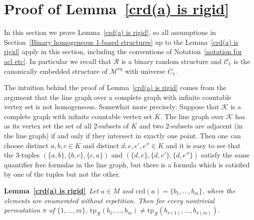 \documentclass[11pt, twoside]{amsart}
\numberwithin{equation}{section}
\newcommand{\tp}{\mathrm{tp}}
\newcommand{\crd}{\mathrm{crd}}
\newcommand{\meq}{^{\mathrm{eq}}}
\newcommand{\mcC}{\mathcal{C}}
\newcommand{\mcK}{\mathcal{K}}
\newcommand{\mcM}{\mathcal{M}}
\newcommand{\mcR}{\mathcal{R}}
\begin{document}
\section{Proof of Lemma~\ref{crd(a) is rigid}}\label{Proof of the main technical result}


\noindent
In this section we prove Lemma~\ref{crd(a) is rigid}, so all assumptions in Section~\ref{Binary homogeneous 1-based structures}
up to the Lemma~\ref{crd(a) is rigid} apply in this section, including the conventions of Notation~\ref{notation for acl etc}.
In particular we recall that $\mcR$ is a binary random structure and $\mcC_1$ is the canonically embedded structure of $\mcM\meq$
with universe $C_1$.

The intuition behind the proof of Lemma~\ref{crd(a) is rigid} comes from the argument that the line graph over
a complete graph with infinite countable vertex set is not homogeneous. 
Somewhat more precisely: Suppose that $\mcK$ is a complete graph with infinite countable vertex set $K$.
The line graph over $\mcK$ has as its vertex set the set of all 2-subsets of $K$ and two 2-subsets are adjacent (in the line graph)
if and only if they intersect in exactly one point. Then one can choose distinct $a, b, c \in K$
and distinct $d, e, e', e'' \in K$ and it is easy to see that the 3-tuples
$(\{a, b\}, \{b, c\}, \{c, a\})$ and $(\{d, e\}, \{d, e'\}, \{d, e''\})$ satisfy the same quantifier free 
formulas in the line graph, but there is a formula which is satisfied by one of the tuples but not the other.

\medskip

\noindent
{\bf Lemma~\ref{crd(a) is rigid}}{\em \
Let $a \in M$ and $\crd(a)  = \{b_1, \ldots, b_m\}$, where the elements are enumerated without repetition.
Then for every nontrivial permutation $\pi$ of $\{1, \ldots, m\}$,
$\tp_\mcR(b_1, \ldots, b_m) \neq \tp_\mcR(b_{\pi(1)}, \ldots, b_{\pi(m)})$.
}

\medskip
\end{document}
